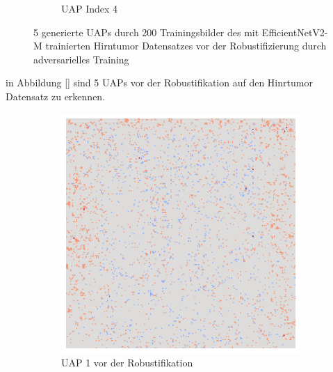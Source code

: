 \begin{figure}[ht!]
\begin{subfigure}{0.19\linewidth}
        \caption{UAP Index 4}
    \end{subfigure}
    \caption{5 generierte UAPs durch 200 Trainingsbilder des mit EfficientNetV2-M trainierten Hirntumor Datensatzes vor der Robustifizierung durch adversarielles Training}
    \label{fig:uap-resnet18-mri-rob0}
\end{figure}

in Abbildung \ref{} sind 5 UAPs vor der Robustifikation auf den Hinrtumor Datensatz zu erkennen. 

\newpage

\begin{figure}[ht!]
    \centering
    \begin{subfigure}{0.19\linewidth}
        \centering
        \includegraphics[height=1\linewidth]{01-images/05-resultate/uap_resnet/uap0-resnet18-mri-n200-robustificationslevel0.png}
        \caption{UAP 1 vor der Robustifikation}
    \end{subfigure}
    \begin{subfigure}{0.19\linewidth}
        \centering

\end{subfigure}
\end{figure}

